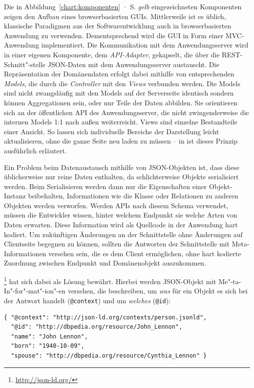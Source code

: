 Die in Abbildung~\ref{chart:komponenten} · S.\pageref{chart:komponenten} \emph{gelb} eingezeichneten Komponenten zeigen den Aufbau eines browserbasierten GUIs. Mittlerweile ist es üblich, klassische Paradigmen aus der Softwarentwicklung auch in browserbasierten Anwendung zu verwenden. Dementsprechend wird die GUI in Form einer MVC-Anwendung implementiert. Die Kommunikation mit dem Anwendungsserver wird in einer eigenen Komponente, dem \emph{API-Adapter}, gekapselt, die über die REST-Schnitt"-stelle JSON-Daten mit dem Anwendungsserver austauscht. Die Repräsentation der Domänendaten erfolgt dabei mithilfe von entsprechenden \emph{Models}, die durch die \emph{Controller} mit den \emph{Views} verbunden werden. Die Models sind nicht zwangsläufig mit den Models auf der Serverseite identisch sondern können Aggregationen sein, oder nur Teile der Daten abbilden. Sie orientieren sich an der öffentlichen API des Anwendungsserver, die nicht zwingenderweise die internen Models 1:1 nach außen weiterreicht. Views sind einzelne Bestandteile einer Ansicht. So lassen sich individuelle Bereiche der Darstellung leicht aktualisieren, ohne die ganze Seite neu laden zu müssen -- in \cite[S.1--5 und S.65--72]{maccaw2011javascript} ist dieses Prinzip ausführlich erläutert.

Ein Problem beim Datenaustausch mithilfe von JSON-Objekten ist, dass diese üblicherweise nur reine Daten enthalten, da schlichterweise Objekte serialisiert werden. Beim Serialisieren werden dann nur die Eigenschaften einer Objekt-Instanz beibehalten, Informationen wie die Klasse oder Relationen zu anderen Objekten werden verworfen. Werden APIs nach diesem Schema verwendet, müssen die Entwickler wissen, hinter welchem Endpunkt sie welche Arten von Daten erwarten. Diese Information wird als Quellcode in der Anwendung hart kodiert. Um zukünftigen Änderungen an der Schnittstelle ohne Änderungen auf Clientseite begegnen zu können, sollten die Antworten der Schnittstelle mit Meta-Informationen versehen sein, die es dem Client ermöglichen, ohne hart kodierte Zuordnung zwischen Endpunkt und Domänenobjekt auszukommen. 

\begin{samepage}
\footnote{\url{http://json-ld.org/}} hat sich dabei als Lösung bewährt. Hierbei werden JSON-Objekt mit Me"-ta-In"-for"-mat"-ion"-en versehen, die beschreiben, um \emph{was} für ein Objekt es sich bei der Antwort handelt (\texttt{@context}) und um \emph{welches} (\texttt{@id}):

\begin{verbatim}
{ "@context": "http://json-ld.org/contexts/person.jsonld",
  "@id": "http://dbpedia.org/resource/John_Lennon",
  "name": "John Lennon",
  "born": "1940-10-09",
  "spouse": "http://dbpedia.org/resource/Cynthia_Lennon" }
\end{verbatim}
\end{samepage}

